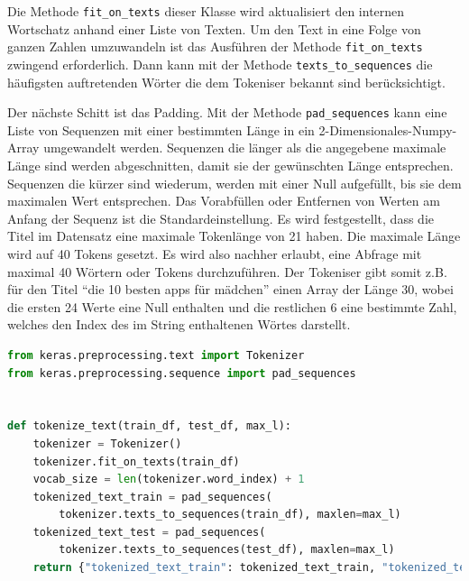 Die Methode \texttt{fit\_on\_texts} dieser Klasse wird aktualisiert den internen Wortschatz anhand einer Liste von Texten. Um den Text in eine Folge von ganzen Zahlen umzuwandeln ist das Ausführen der Methode \texttt{fit\_on\_texts} zwingend erforderlich. Dann kann mit der Methode \texttt{texts\_to\_sequences} die häufigsten auftretenden Wörter die dem Tokeniser bekannt sind berücksichtigt.

Der nächste Schitt ist das Padding. Mit der Methode \texttt{pad\_sequences} kann eine Liste von Sequenzen mit einer bestimmten Länge in ein 2-Dimensionales-Numpy-Array umgewandelt werden. Sequenzen die länger als die angegebene maximale Länge sind werden abgeschnitten, damit sie der gewünschten Länge entsprechen. Sequenzen die kürzer sind wiederum, werden mit einer Null aufgefüllt, bis sie dem maximalen Wert entsprechen. Das Vorabfüllen oder Entfernen von Werten am Anfang der Sequenz ist die Standardeinstellung. Es wird festgestellt, dass die Titel im Datensatz eine maximale Tokenlänge von 21 haben. Die maximale Länge wird auf 40 Tokens gesetzt. Es wird also nachher erlaubt, eine Abfrage mit maximal 40 Wörtern oder Tokens durchzuführen. Der Tokeniser gibt somit z.B. für den Titel \enquote{die 10 besten apps für mädchen} einen Array der Länge 30, wobei die ersten 24 Werte eine Null enthalten und die restlichen 6 eine bestimmte Zahl, welches den Index des im String enthaltenen Wörtes darstellt. 



\begin{lstlisting}[language=Python,caption=Die Tokeniser-Funktion]
from keras.preprocessing.text import Tokenizer
from keras.preprocessing.sequence import pad_sequences


def tokenize_text(train_df, test_df, max_l):
    tokenizer = Tokenizer()
    tokenizer.fit_on_texts(train_df)
    vocab_size = len(tokenizer.word_index) + 1
    tokenized_text_train = pad_sequences(
        tokenizer.texts_to_sequences(train_df), maxlen=max_l)
    tokenized_text_test = pad_sequences(
        tokenizer.texts_to_sequences(test_df), maxlen=max_l)
    return {"tokenized_text_train": tokenized_text_train, "tokenized_text_test": tokenized_text_test, "vocab_size": vocab_size, "tokenizer": tokenizer}
\end{lstlisting}\label{TokenizerFunc}


